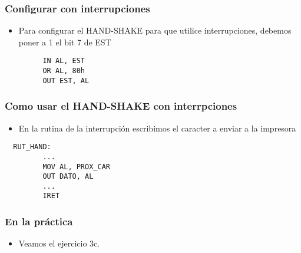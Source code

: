 \documentclass{beamer}
\begin{document}
\begin{frame}[fragile]
\frametitle{Configurar con interrupciones}
\begin{itemize}
 \item Para configurar el HAND-SHAKE para que utilice interrupciones, debemos poner a 1 el bit 7 de EST
\end{itemize}
\begin{block}{}
 \begin{verbatim}
         IN AL, EST 
         OR AL, 80h
         OUT EST, AL
 \end{verbatim}
\end{block}
\end{frame}

\begin{frame}[fragile]
\frametitle{Como usar el HAND-SHAKE con interrpciones}
\begin{itemize}
 \item En la rutina de la interrupción escribimos el caracter a enviar a la impresora
\end{itemize}
\begin{block}{}
 \begin{verbatim}
  RUT_HAND:
         ...
         MOV AL, PROX_CAR
         OUT DATO, AL
         ...
         IRET
 \end{verbatim}
\end{block}
\end{frame}

\begin{frame}
\frametitle{En la práctica}
\begin{itemize}
 \item Veamos el ejercicio 3c. 
\end{itemize}
\end{frame}
\end{document}
